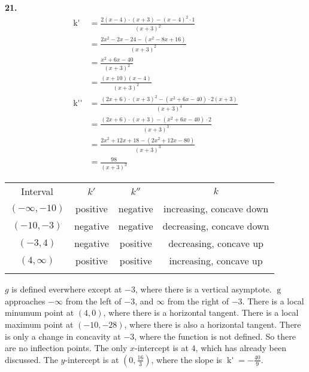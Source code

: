 \documentclass[12pt,]{book}
\theoremstyle{plain}
\theoremstyle{definition}
\numberwithin{equation}{section}
\newcommand{\hrulethin}  {\noalign{\hrule height 0.04em}}
\newcommand{\hrulemedium}{\noalign{\hrule height 0.07em}}
\newcommand{\hrulethick} {\noalign{\hrule height 0.11em}}
\newcommand{\fe}[2]{\mathop{{#1}{\left(#2\right)}}}
\newcommand{\ointerval}[2]{\left(#1,#2\right)}
\newcommand{\point}[2]{\left(#1,#2\right)}
\newcommand{\fd}[1]{#1'}
\newcommand{\sd}[1]{#1''}
\begin{document}
\begin{multicols}{2}
{{
}
\par\smallskip
\noindent\textbf{21.}\quad{}\begin{align*}
\fe{\fd{k}}{x}&=\frac{2(x-4)\cdot(x+3)-(x-4)^2\cdot1}{(x+3)^2}\\
&=\frac{2x^2-2x-24-(x^2-8x+16)}{(x+3)^2}\\
&=\frac{x^2+6x-40}{(x+3)^2}\\
&=\frac{(x+10)(x-4)}{(x+3)^2}\\
\fe{\sd{k}}{x}&=\frac{(2x+6)\cdot(x+3)^2-\left(x^2+6x-40\right)\cdot2(x+3)}{(x+3)^4}\\
&=\frac{(2x+6)\cdot(x+3)-\left(x^2+6x-40\right)\cdot2}{(x+3)^3}\\
&=\frac{2x^2+12x+18-\left(2x^2+12x-80\right)}{(x+3)^3}\\
&=\frac{98}{(x+3)^3}
\end{align*}%
\begin{tabular}{cccc}\hrulethick
Interval&\(\fd{k}\)&\(\sd{k}\)&\(k\)\\\hrulemedium
\(\ointerval{-\infty}{-10}\)&positive&negative&increasing, concave down\\\hrulethin
\(\ointerval{-10}{-3}\)&negative&negative&decreasing, concave down\\\hrulethin
\(\ointerval{-3}{4}\)&negative&positive&decreasing, concave up\\\hrulethin
\(\ointerval{4}{\infty}\)&positive&positive&increasing, concave up\\\hrulethin
\end{tabular}
\par
\(g\) is defined everwhere except at \(-3\), where there is a vertical asymptote. \(\fe{g}{x}\) approaches \(-\infty\) from the left of \(-3\), and \(\infty\) from the right of \(-3\). There is a local minumum point at \(\point{4}{0}\), where there is a horizontal tangent. There is a local maximum point at \(\point{-10}{-28}\), where there is also a horizontal tangent. There is only a change in concavity at \(-3\), where the function is not defined. So there are no inflection points. The only \(x\)-intercept is at \(4\), which has already been discussed. The \(y\)-intercept is at \(\point{0}{\frac{16}{3}}\), where the slope is \(\fe{\fd{k}}{0}=-\frac{40}{9}\).%
}
\end{multicols}
\end{document}
